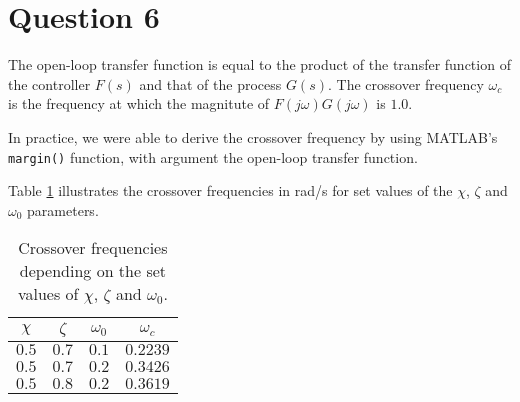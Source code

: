 \section{Question 6}

The open-loop transfer function is equal to the product of the transfer function
of the controller $F(s)$ and that of the process $G(s)$. The crossover frequency
$\omega_c$ is the frequency at which the magnitute of $F(j\omega)G(j\omega)$ is
$1.0$.

In practice, we were able to derive the crossover frequency by using MATLAB's
\texttt{margin()} function, with argument the open-loop transfer function.

Table \ref{tbl:Q6} illustrates the crossover frequencies in rad/s for set values
of the $\chi$, $\zeta$ and $\omega_0$ parameters.

\begin{table}[H]\centering
  \begin{tabular}{ccc|c}
  $\chi$  & $\zeta$  & $\omega_0$  & $\omega_c$   \\ \hline
  $0.5$   & $0.7$    & $0.1$       & $0.2239$     \\ \hline
  $0.5$   & $0.7$    & $0.2$       & $0.3426$     \\ \hline
  $0.5$   & $0.8$    & $0.2$       & $0.3619$     \\ \hline
  \end{tabular}
  \caption{Crossover frequencies depending on the set values of $\chi$, $\zeta$
    and $\omega_0$.}
  \label{tbl:Q6}
\end{table}
